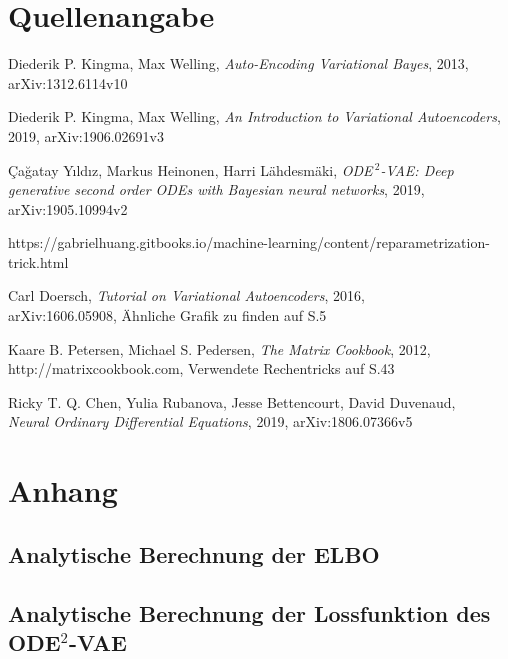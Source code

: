 \documentclass[12pt]{article}
\begin{document}
	\section[Quellenangabe]{Quellenangabe}
	\begin{thebibliography}{9}
		Diederik P. Kingma, Max Welling,
		\textit{Auto-Encoding Variational Bayes},
		2013,\\
		arXiv:1312.6114v10
		
		Diederik P. Kingma, Max Welling,
		\textit{An Introduction to Variational Autoencoders}, 
		2019,
		arXiv:1906.02691v3
		
		Çağatay Yıldız, Markus Heinonen, Harri Lähdesmäki,
		\textit{ODE$^{\ 2}$-VAE: Deep generative second order ODEs with Bayesian neural networks}, 
		2019,
		arXiv:1905.10994v2
		
		https://gabrielhuang.gitbooks.io/machine-learning/content/reparametrization-trick.html

		Carl Doersch,
		\textit{Tutorial on Variational Autoencoders},
		2016,\\
		arXiv:1606.05908,
		Ähnliche Grafik zu finden auf S.5

		Kaare B. Petersen, Michael S. Pedersen,
		\textit{The Matrix Cookbook},
		2012,
		http://matrixcookbook.com, Verwendete Rechentricks auf S.43
		
		Ricky T. Q. Chen, Yulia Rubanova, Jesse Bettencourt, David Duvenaud,\\
		\textit{Neural Ordinary Differential Equations},
		2019, arXiv:1806.07366v5

	\end{thebibliography}
	\section[Anhang]{Anhang}
	\subsection[Analytische Berechnung der ELBO]{Analytische Berechnung der ELBO}
	\subsection[Analytische Berechnung der Lossfunktion des ODE$^2$-VAE]{Analytische Berechnung der Lossfunktion des ODE$^2$-VAE}
\end{document}
